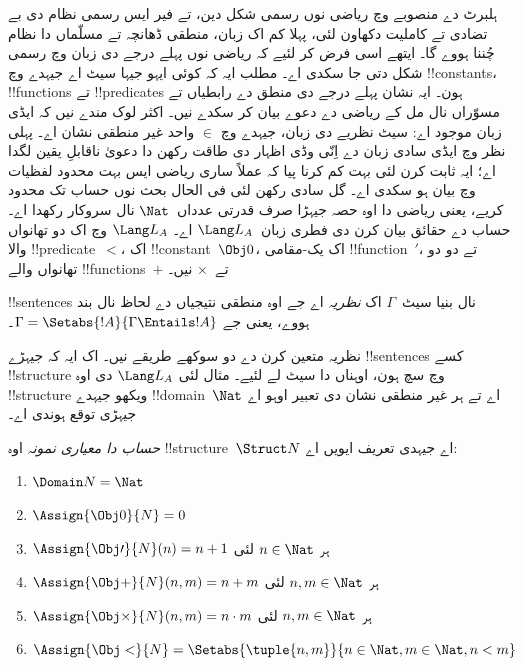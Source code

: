 \documentclass[../../../include/open-logic-section]{subfiles}
\begin{document}


ہلبرٹ دے منصوبے وچ ریاضی نوں رسمی شکل دین،
تے فیر ایس رسمی نظام دی بے تضادی تے کاملیت
دکھاون لئی، پہلا کم اک زبان، منطقی ڈھانچہ تے
مسلّماں دا نظام چُننا ہووے گا۔ ایتھے اسی فرض
کر لئیے کہ ریاضی نوں پہلے درجے دی زبان وچ
رسمی شکل دتی جا سکدی اے۔ مطلب ایہ کہ
کوئی ایہو جیہا سیٹ اے جیہدے وچ !!{constant}s،
!!{function}s تے !!{predicate}s ہون۔ ایہ نشان
پہلے درجے دی منطق دے رابطیاں تے مسوّراں نال
مل کے ریاضی دے دعوے بیان کر سکدے نیں۔ اکثر لوک
مندے نیں کہ ایڈی زبان موجود اے: سیٹ نظریے
دی زبان، جیہدے وچ $\in$ واحد غیر منطقی نشان
اے۔ پہلی نظر وچ ایڈی سادی زبان دے اِنّی
وڈی اظہار دی طاقت رکھن دا دعویٰ ناقابلِ
یقین لگدا اے؛ ایہ ثابت کرن لئی بہت کم
کرنا پیا کہ عملاً ساری ریاضی ایس بہت
محدود لفظیات وچ بیان ہو سکدی اے۔ گل
سادی رکھن لئی فی الحال بحث نوں حساب
تک محدود کریے، یعنی ریاضی دا اوہ
حصہ جیہڑا صرف قدرتی عدداں~$\Nat$ نال
سروکار رکھدا اے۔ حساب دے حقائق بیان
کرن دی فطری زبان~$\Lang L_A$ اے۔
$\Lang L_A$ وچ اک دو تھانواں
والا !!{predicate}~$<$، اک
!!{constant}~$\Obj 0$،
اک یک-مقامی !!{function}~$\prime$،
تے دو دو تھانواں والے
!!{function}s~$+$ تے~$\times$ نیں۔

\begin{defn}
!!{sentence}s نال بنیا سیٹ~$\Gamma$ اک
\emph{نظریہ} اے جے اوہ منطقی نتیجیاں
دے لحاظ نال بند ہووے، یعنی جے
$\Gamma = \Setabs{!A}{\Gamma \Entails
!A}$۔
\end{defn}

نظریہ متعین کرن دے دو سوکھے طریقے
نیں۔ اک ایہ کہ جیہڑے !!{sentence}s کسے
!!{structure} وچ سچ ہون، اوہناں دا سیٹ لے لئیے۔
مثال لئی $\Lang L_A$ دی
اوہ !!{structure} ویکھو جیہدے
!!{domain}~$\Nat$ اے تے
ہر غیر منطقی نشان دی تعبیر
اوہو اے جیہڑی توقع ہوندی اے۔

\begin{defn}
\emph{حساب دا معیاری نمونہ}
اوہ !!{structure}~$\Struct
N$ اے جیہدی تعریف ایویں اے:
\begin{enumerate}
\item $\Domain N = \Nat$
\item $\Assign{\Obj 0}{N} = 0$
\item $\Assign{\Obj \prime}{N}(n) = n + 1$ ہر $n \in \Nat$ لئی
\item $\Assign{\Obj +}{N}(n, m) = n + m$ ہر $n, m \in \Nat$ لئی
\item $\Assign{\Obj \times}{N}(n, m) = n\cdot m$ ہر $n, m \in \Nat$ لئی
\item $\Assign{\Obj <}{N} = \Setabs{\tuple{n, m}}{n \in \Nat, m \in
  \Nat, n < m}$
\end{enumerate}
\end{defn}
\end{document}
